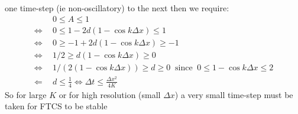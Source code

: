 {\begin{enumerate}
one time-step (ie non-oscillatory) to the next then we require: 
\begin{align*}
 & 0\le A\le1\\
\iff & 0\le1-2d(1-\cos k\Delta x)\le1\\
\iff & 0\ge-1+2d(1-\cos k\Delta x)\ge-1\\
\iff & 1/2\ge d(1-\cos k\Delta x)\ge0\\
\iff & 1/(2(1-\cos k\Delta x))\ge d\ge0~\text{ since }~0\le1-\cos k\Delta x\le2\\
\Leftarrow~~ & d\le\frac{1}{4}\iff\Delta t\le\frac{\Delta x^{2}}{4K}
\end{align*}
So for large $K$ or for high resolution (small $\Delta x$) a very
small time-step must be taken for FTCS to be stable
\end{enumerate}
}
